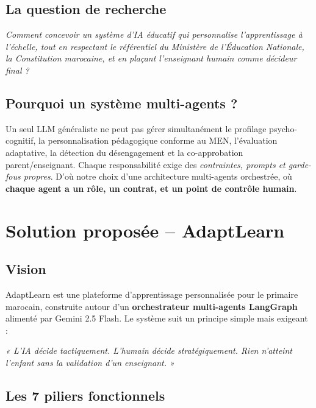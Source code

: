 \documentclass[11pt,a4paper]{article}
\begin{document}
\subsection{La question de recherche}

\emph{Comment concevoir un système d'IA éducatif qui personnalise l'apprentissage à
l'échelle, tout en respectant le référentiel du Ministère de l'Éducation Nationale, la
Constitution marocaine, et en plaçant l'enseignant humain comme décideur final ?}

\subsection{Pourquoi un système multi-agents ?}

Un seul LLM généraliste ne peut pas gérer simultanément le profilage psycho-cognitif,
la personnalisation pédagogique conforme au MEN, l'évaluation adaptative,
la détection du désengagement et la co-approbation parent/enseignant. Chaque responsabilité
exige des \emph{contraintes, prompts et garde-fous propres}. D'où notre choix d'une
architecture multi-agents orchestrée, où \textbf{chaque agent a un rôle, un contrat,
et un point de contrôle humain}.

\newpage

\section{Solution proposée -- AdaptLearn}

\subsection{Vision}

AdaptLearn est une plateforme d'apprentissage personnalisée pour le primaire marocain,
construite autour d'un \textbf{orchestrateur multi-agents LangGraph} alimenté par
Gemini 2.5 Flash. Le système suit un principe simple mais exigeant :

\begin{keybox}
\centering\itshape
\color{primary}
« L'IA décide tactiquement. L'humain décide stratégiquement. Rien n'atteint l'enfant
sans la validation d'un enseignant. »
\end{keybox}

\subsection{Les 7 piliers fonctionnels}
\end{document}
